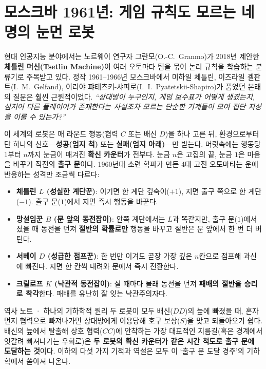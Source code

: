 \documentclass[11pt,a4paper]{article}
\begin{document}
\section{모스크바 1961년: 게임 규칙도 모르는 네 명의 눈먼 로봇}

현대 인공지능 분야에서는 노르웨이 연구자 그란모(O.-C.~Granmo)가 2018년 제안한 \textbf{체틀린 머신(Tsetlin Machine)}이 여러 오토마타 팀을 묶어 논리 규칙을 학습하는 분류기로 주목받고 있다. 정작 1961--1966년 모스크바에서 미하일 체틀린, 이즈라일 겔판트(I.~M.~Gelfand), 이리야 퍄테츠키-샤피로(I.~I.~Pyatetskii-Shapiro)가 품었던 본래의 질문은 훨씬 근원적이었다. \emph{``상대방이 누구인지, 게임 보수표가 어떻게 생겼는지, 심지어 다른 플레이어가 존재한다는 사실조차 모르는 단순한 기계들이 모여 집단 지성을 이룰 수 있는가?''}

이 세계의 로봇은 매 라운드 행동(협력 $C$ 또는 배신 $D$)을 하나 고른 뒤, 환경으로부터 단 하나의 신호---\textbf{성공(엄지 척)} 또는 \textbf{실패(엄지 아래)}---만 받는다. 머릿속에는 행동당 $1$부터 $n$까지 눈금이 매겨진 \textbf{확신 카운터}가 전부다. 눈금 $n$은 고집의 끝, 눈금 $1$은 마음을 바꾸기 직전의 \textbf{출구 문}이다. 1960년대 소련 학파가 만든 4대 고전 오토마타는 운에 반응하는 성격만 조금씩 다르다:

\begin{itemize}
  \item \textbf{체틀린 $L$ (성실한 계단꾼)}: 이기면 한 계단 깊숙이($+1$), 지면 출구 쪽으로 한 계단($-1$). 출구 문($1$)에서 지면 즉시 행동을 바꾼다.
  \item \textbf{망설임꾼 $B$ (문 앞의 동전잡이)}: 안쪽 계단에서는 $L$과 똑같지만, 출구 문($1$)에서 졌을 때 동전을 던져 \textbf{절반의 확률로만} 행동을 바꾸고 절반은 문 앞에서 한 번 더 버틴다.
  \item \textbf{서베이 $D$ (성급한 점프꾼)}: 한 번만 이겨도 곧장 가장 깊은 $n$칸으로 점프해 과신에 빠진다. 지면 한 칸씩 내려와 문에서 즉시 전환한다.
  \item \textbf{크릴로프 $K$ (낙관적 동전잡이)}: 질 때마다 몰래 동전을 던져 \textbf{패배의 절반을 승리로 착각}한다. 패배를 유난히 잘 잊는 낙관주의자다.
\end{itemize}

\begin{storybox}{역사 노트 · 하나의 기하학적 원리}
두 로봇이 모두 배신($DD$)의 늪에 빠졌을 때, 혼자 먼저 협력으로 빠져나가면 상대방에게 이용당해 호구 보상($S$)을 맞고 되돌아오기 쉽다. 배신의 늪에서 탈출해 상호 협력($CC$)에 안착하는 가장 대표적인 지름길(혹은 경계에서 엇갈려 빠져나가는 우회로)은 \textbf{두 로봇의 확신 카운터가 같은 시간 척도로 출구 문에 도달하는 것}이다. 이하의 다섯 가지 기적과 역설은 모두 이 `출구 문 도달 경주'의 기하학에서 쏟아져 나온다.
\end{storybox}
\end{document}
